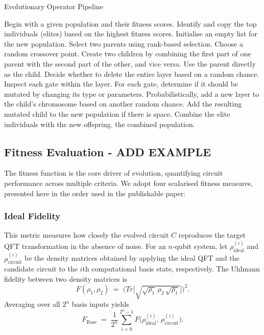 \documentclass[11pt,a4paper]{article}
\begin{document}
\begin{algorithm}[H]
\caption{Evolutionary Operator Pipeline}
\begin{algorithmic}[1]
\State Begin with a given population and their fitness scores.
\State Identify and copy the top individuals (elites) based on the highest fitness scores.
\State Initialise an empty list for the new population.
    \State Select two parents using rank-based selection.
        \State Choose a random crossover point.
        \State Create two children by combining the first part of one parent with the second part of the other, and vice versa.
    \Else
        \State Use the parent directly as the child.
    \EndIf
            \State Decide whether to delete the entire layer based on a random chance.
                \State Inspect each gate within the layer.
                \State For each gate, determine if it should be mutated by changing its type or parameters.
            \EndIf
        \EndFor
        \State Probabilistically, add a new layer to the child's chromosome based on another random chance.
        \State Add the resulting mutated child to the new population if there is space.
    \EndFor
\EndWhile
\State Combine the elite individuals with the new offspring.
\State \Return the combined population.
\end{algorithmic}
\end{algorithm}

\subsection{Fitness Evaluation - ADD EXAMPLE}
The fitness function is the core driver of evolution, quantifying circuit performance across multiple criteria.  We adopt four scalarised fitness measures, presented here in the order used in the publishable paper:

\subsubsection*{Ideal Fidelity}
This metric measures how closely the evolved circuit $C$ reproduces the target QFT transformation in the absence of noise.  For an $n$‐qubit system, let $\rho_{\mathrm{ideal}}^{(i)}$ and $\rho_{\mathrm{circuit}}^{(i)}$ be the density matrices obtained by applying the ideal QFT and the candidate circuit to the $i$th computational basis state, respectively.  The Uhlmann fidelity between two density matrices is
\[
F(\rho_1,\rho_2)\;=\;\bigl(Tr\bigl[\sqrt{\sqrt{\rho_1}\,\rho_2\,\sqrt{\rho_1}}\bigr]\bigr)^2.
\]
Averaging over all $2^n$ basis inputs yields
\begin{equation}
  F_{\mathrm{Base}}
  \;=\;\frac{1}{2^n}\sum_{i=0}^{2^n-1}
    F\bigl(\rho_{\mathrm{ideal}}^{(i)},\,\rho_{\mathrm{circuit}}^{(i)}\bigr).
\end{equation}
\end{document}
